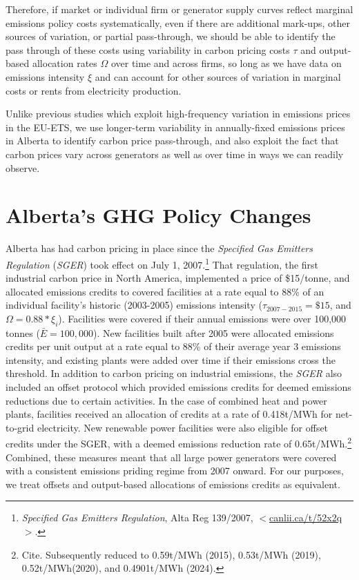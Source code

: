 \documentclass[12pt]{article}
\begin{document}
Therefore, if market or individual firm or generator supply curves reflect marginal emissions policy costs systematically, even if there are additional mark-ups, other sources of variation, or partial pass-through, we should be able to identify the pass through of these costs using variability in carbon pricing costs $\tau$ and output-based allocation rates $\Omega$ over time and across firms, so long as we have data on emissions intensity $\xi$ and can account for other sources of variation in marginal costs or rents from electricity production.

Unlike previous studies which exploit high-frequency variation in emissions prices in the EU-ETS, we use longer-term variability in annually-fixed emissions prices in Alberta to identify carbon price pass-through, and also exploit the fact that carbon prices vary across generators as well as over time in ways we can readily observe.


\section{Alberta's GHG Policy Changes}\label{sec:policy}

Alberta has had carbon pricing in place since the \emph{Specified Gas Emitters Regulation} (\emph{SGER}) took effect on July 1, 2007.\footnote{\textit{Specified Gas Emitters Regulation}, Alta Reg 139/2007, $<$\url{canlii.ca/t/52x2q}$>$.} That regulation, the first industrial carbon price in North America, implemented a price of \$15/tonne, and allocated emissions credits to covered facilities at a rate equal to 88\% of an individual facility's historic (2003-2005) emissions intensity ($\tau_{2007-2015}=\$15$, and $\Omega=0.88*\xi_i$). Facilities were covered if their annual emissions were over 100,000 tonnes ($\bar{E}=100,000$). New facilities built after 2005 were allocated emissions credits per unit output at a rate equal to 88\% of their average year 3 emissions intensity, and existing plants were added over time if their emissions cross the threshold. In addition to carbon pricing on industrial emissions, the \emph{SGER} also included an offset protocol which provided emissions credits for deemed emissions reductions due to certain activities. In the case of combined heat and power plants, facilities received an allocation of credits at a rate of 0.418t/MWh for net-to-grid electricity. New renewable power facilities were also eligible for offset credits under the SGER, with a deemed emissions reduction rate of 0.65t/MWh.\footnote{Cite. Subsequently reduced to 0.59t/MWh (2015), 0.53t/MWh (2019), 0.52t/MWh(2020), and 0.4901t/MWh (2024).} Combined, these measures meant that all large power generators were covered with a consistent emissions priding regime from 2007 onward. For our purposes, we treat offsets and output-based allocations of emissions credits as equivalent.
\end{document}
